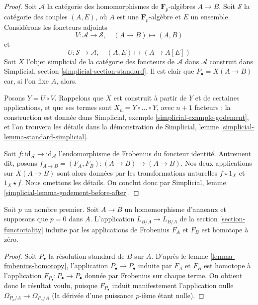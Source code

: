 \begin{proof}
Soit $\mathcal{A}$ la catégorie des homomorphismes de $\mathbf{F}_p$-algèbres
$A \to B$. Soit $\mathcal{S}$ la catégorie des couples $(A, E)$, où $A$ est
une $\mathbf{F}_p$-algèbre et $E$ un ensemble. Considérons les foncteurs
adjoints
$$
V : \mathcal{A} \to \mathcal{S}, \quad (A \to B) \mapsto (A, B)
$$
et
$$
U : \mathcal{S} \to \mathcal{A}, \quad (A, E) \mapsto (A \to A[E])
$$
Soit $X$ l'objet simplicial de la catégorie des foncteurs de $\mathcal{A}$
dans $\mathcal{A}$ construit dans Simplicial, section
\ref{simplicial-section-standard}. Il est clair que
$P_\bullet = X(A \to B)$ car, si l'on fixe $A$, alors.

\medskip\noindent
Posons $Y = U \circ V$. Rappelons que $X$ est construit à partir de $Y$ et de
certaines applications, et que ses termes sont
$X_n = Y \circ \ldots \circ Y$, avec $n + 1$ facteurs ; la construction est
donnée dans Simplicial, exemple \ref{simplicial-example-godement}, et l'on
trouvera les détails dans la démonstration de Simplicial, lemme
\ref{simplicial-lemma-standard-simplicial}.

\medskip\noindent
Soit $f : \text{id}_\mathcal{A} \to \text{id}_\mathcal{A}$ l'endomorphisme de
Frobenius du foncteur identité. Autrement dit, posons
$f_{A \to B} = (F_A, F_B) : (A \to B) \to (A \to B)$. Nos deux applications
sur $X(A \to B)$ sont alors données par les transformations naturelles
$f \star 1_X$ et $1_X \star f$. Nous omettons les détails. On conclut donc par
Simplicial, lemme \ref{simplicial-lemma-godement-before-after}.
\end{proof}

\begin{lemma}
\label{lemma-frobenius-acts-as-zero}
Soit $p$ un nombre premier. Soit $A \to B$ un homomorphisme d'anneaux et
supposons que $p = 0$ dans $A$. L'application $L_{B/A} \to L_{B/A}$ de la
section \ref{section-functoriality} induite par les applications de Frobenius
$F_A$ et $F_B$ est homotope à zéro.
\end{lemma}

\begin{proof}
Soit $P_\bullet$ la résolution standard de $B$ sur $A$. D'après le lemme
\ref{lemma-frobenius-homotopy}, l'application $P_\bullet \to P_\bullet$ induite
par $F_A$ et $F_B$ est homotope à l'application
$F_{P_\bullet} : P_\bullet \to P_\bullet$ donnée par Frobenius sur chaque
terme. On obtient donc le résultat voulu, puisque $F_{P_\bullet}$ induit
manifestement l'application nulle $\Omega_{P_n/A} \to \Omega_{P_n/A}$ (la
dérivée d'une puissance $p$-ième étant nulle).
\end{proof}

